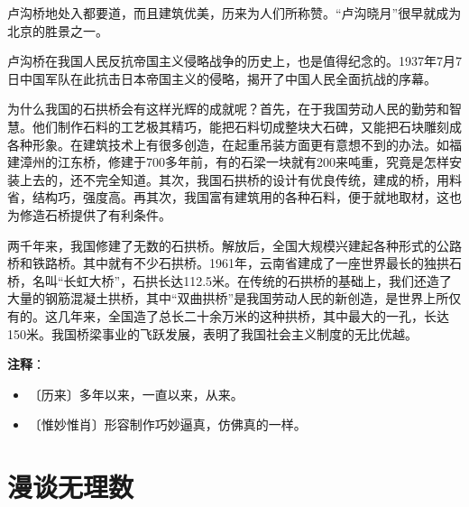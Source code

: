 \documentclass[12pt,UTF-8,openany]{ctexbook}
\begin{document}
\begin{normalsize}
    卢沟桥地处入都要道，而且建筑优美，历来为人们所称赞。“卢沟晓月”很早就成为北京的胜景之一。
    
    卢沟桥在我国人民反抗帝国主义侵略战争的历史上，也是值得纪念的。1937年7月7日中国军队在此抗击日本帝国主义的侵略，揭开了中国人民全面抗战的序幕。
    
    为什么我国的石拱桥会有这样光辉的成就呢？首先，在于我国劳动人民的勤劳和智慧。他们制作石料的工艺极其精巧，能把石料切成整块大石碑，又能把石块雕刻成各种形象。在建筑技术上有很多创造，在起重吊装方面更有意想不到的办法。如福建漳州的江东桥，修建于700多年前，有的石梁一块就有200来吨重，究竟是怎样安装上去的，还不完全知道。其次，我国石拱桥的设计有优良传统，建成的桥，用料省，结构巧，强度高。再其次，我国富有建筑用的各种石料，便于就地取材，这也为修造石桥提供了有利条件。
    
    两千年来，我国修建了无数的石拱桥。解放后，全国大规模兴建起各种形式的公路桥和铁路桥。其中就有不少石拱桥。1961年，云南省建成了一座世界最长的独拱石桥，名叫“长虹大桥”，石拱长达112.5米。在传统的石拱桥的基础上，我们还造了大量的钢筋混凝土拱桥，其中“双曲拱桥”是我国劳动人民的新创造，是世界上所仅有的。这几年来，全国造了总长二十余万米的这种拱桥，其中最大的一孔，长达150米。我国桥梁事业的飞跃发展，表明了我国社会主义制度的无比优越。
    
\end{normalsize}


\newpage

\textbf{注释}：

\vspace{-1em}

\begin{itemize}
    \setlength\itemsep{-0.2em}
    \item 〔历来〕多年以来，一直以来，从来。
    \item 〔惟妙惟肖〕形容制作巧妙逼真，仿佛真的一样。
\end{itemize}

\chapter{漫谈无理数}
\end{document}
